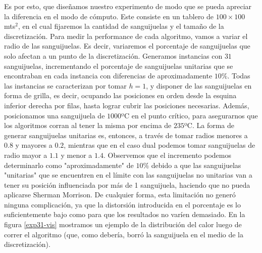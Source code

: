 Es por esto, que dise\~namos nuestro experimento de modo que se pueda apreciar la diferencia en el modo de cómputo. Este consiste en un tablero de $100 \times 100$ mts$^2$, en el cual fijaremos la cantidad de sanguijuelas y el tamaño de la discretizaci\'on. Para medir la performance de cada algoritmo, vamos a variar el radio de las sanguijuelas. Es decir, variaremos el porcentaje de sanguijuelas que solo afectan a un punto de la discretizaci\'on. Generamos instancias con $31$ sanguijuelas, incrementando el porcentaje de sanguijuelas unitarias que se encontraban en cada instancia con diferencias de aproximadamente $10\%$. Todas las instancias se caracterizan por tomar $h = 1$, y disponer de las sanguijuelas en forma de grilla, es decir, ocupando las posiciones en orden desde la esquina inferior derecha por filas, hasta lograr cubrir las posiciones necesarias. Además, posicionamos una sanguijuela de $1000$ºC en el punto crítico, para asegurarnos que los algoritmos corran al tener la misma por encima de $235$ºC. La forma de generar sanguijuelas unitarias es, entonces, a través de tomar radios menores a $0.8$ y mayores a $0.2$, mientras que en el caso dual podemos tomar sanguijuelas de radio mayor a $1.1$ y menor a $1.4$. Observemos que el incremento podemos determinarlo como "aproximadamente" de $10\%$ debido a que las sanguijuelas "unitarias" que se encuentren en el límite con las sanguijuelas no unitarias van a tener su posición influenciada por más de 1 sanguijuela, haciendo que no pueda aplicarse Sherman Morrison. De cualquier forma, esta limitación no generó ninguna complicación, ya que la distorsión introducida en el porcentaje es lo suficientemente bajo como para que los resultados no varíen demasiado. En la figura \ref{exp31-vis} mostramos un ejemplo de la distribución del calor luego de correr el algoritmo (que, como debería, borró la sanguijuela en el medio de la discretización).

